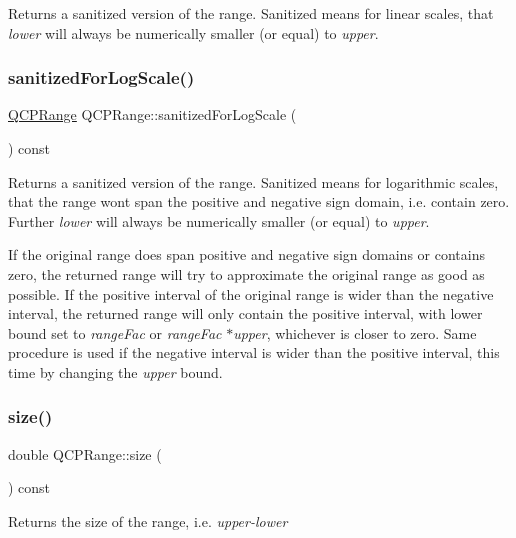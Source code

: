 Returns a sanitized version of the range. Sanitized means for linear scales, that {\itshape lower} will always be numerically smaller (or equal) to {\itshape upper}. \hypertarget{class_q_c_p_range_a3d66288d66e1d6df3636075eb42502ee}{}\label{class_q_c_p_range_a3d66288d66e1d6df3636075eb42502ee} 
\subsubsection{\texorpdfstring{sanitized\+For\+Log\+Scale()}{sanitizedForLogScale()}}
{\footnotesize\ttfamily \hyperlink{class_q_c_p_range}{Q\+C\+P\+Range} Q\+C\+P\+Range\+::sanitized\+For\+Log\+Scale (\begin{DoxyParamCaption}{ }\end{DoxyParamCaption}) const}

Returns a sanitized version of the range. Sanitized means for logarithmic scales, that the range won\textquotesingle{}t span the positive and negative sign domain, i.\+e. contain zero. Further {\itshape lower} will always be numerically smaller (or equal) to {\itshape upper}.

If the original range does span positive and negative sign domains or contains zero, the returned range will try to approximate the original range as good as possible. If the positive interval of the original range is wider than the negative interval, the returned range will only contain the positive interval, with lower bound set to {\itshape range\+Fac} or {\itshape range\+Fac} $\ast${\itshape upper}, whichever is closer to zero. Same procedure is used if the negative interval is wider than the positive interval, this time by changing the {\itshape upper} bound. \hypertarget{class_q_c_p_range_a62326e7cc4316b96df6a60813230e63f}{}\label{class_q_c_p_range_a62326e7cc4316b96df6a60813230e63f} 
\subsubsection{\texorpdfstring{size()}{size()}}
{\footnotesize\ttfamily double Q\+C\+P\+Range\+::size (\begin{DoxyParamCaption}{ }\end{DoxyParamCaption}) const}

Returns the size of the range, i.\+e. {\itshape upper-\/{\itshape lower} } \hypertarget{class_q_c_p_range_ab38bd4841c77c7bb86c9eea0f142dcc0}{}\label{class_q_c_p_range_ab38bd4841c77c7bb86c9eea0f142dcc0} 
